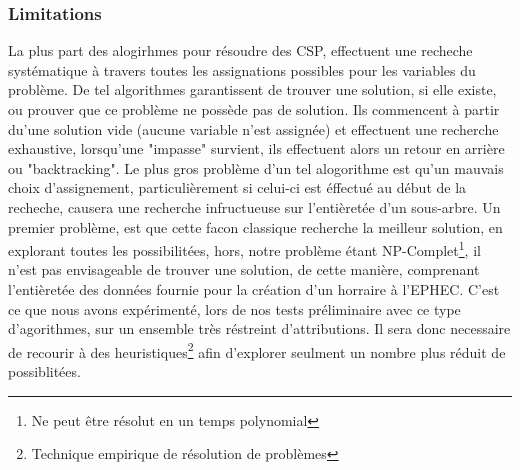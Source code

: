 \subsubsection{Limitations}
La plus part des alogirhmes pour résoudre des CSP, effectuent une recheche systématique à travers toutes les assignations possibles pour les variables du problème. De tel algorithmes garantissent de trouver une solution, si elle existe, ou prouver que ce problème ne possède pas de solution.  
Ils commencent à partir du'une solution vide (aucune variable n'est assignée) et effectuent une recherche exhaustive,
lorsqu'une "impasse" survient, ils effectuent alors un retour en arrière ou "backtracking".  \newline
Le plus gros problème d'un tel alogorithme est qu'un mauvais choix d'assignement,
 particulièrement si celui-ci est éffectué au début de la recheche, causera une recherche infructueuse sur l'entièretée d'un sous-arbre. 
\newline
\indent
Un premier problème, est que cette facon classique recherche la meilleur solution, en explorant toutes les possibilitées, hors, notre problème étant NP-Complet\footnote{Ne peut être résolut en un temps polynomial}, il n'est pas envisageable de trouver une solution, de cette manière, comprenant l'entièretée des données fournie pour la création d'un horraire à l'EPHEC.  C'est ce que nous avons expérimenté, lors de nos tests préliminaire avec ce type d'agorithmes, sur un ensemble très réstreint d'attributions. 
\newline
Il sera donc necessaire de recourir à des heuristiques\footnote{Technique empirique de résolution de problèmes} afin d'explorer seulment un nombre plus réduit de possiblitées.
\newline

